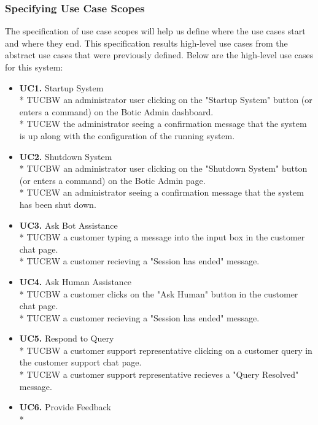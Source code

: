 \documentclass[11pt]{article}
\begin{document}
\subsubsection{Specifying Use Case Scopes}

The specification of use case scopes will help us define where the use cases start and where they end. This specification results high-level use cases from the abstract use cases that were previously defined. Below are the high-level use cases for this system:

\begin{itemize}
	\item[] \textbf{UC1.} Startup System\\*
	TUCBW an administrator user clicking on the "Startup System" button (or enters a command) on the Botic Admin dashboard.\\*
	TUCEW the administrator seeing a confirmation message that the system is up along with the configuration of the running system.
	\item[] \textbf{UC2.} Shutdown System\\*
	TUCBW an administrator user clicking on the "Shutdown System" button (or enters a command) on the Botic Admin page.\\*
	TUCEW an administrator seeing a confirmation message that the system has been shut down.
	\item[] \textbf{UC3.} Ask Bot Assistance\\*
	TUCBW a customer typing a message into the input box in the customer chat page.\\*
	TUCEW a customer recieving a "Session has ended" message.
	\item[] \textbf{UC4.} Ask Human Assistance\\*
	TUCBW a customer clicks on the "Ask Human" button in the customer chat page.\\*
	TUCEW a customer recieving a "Session has ended" message.
	\item[] \textbf{UC5.} Respond to Query\\*
	TUCBW a customer support representative clicking on a customer query in the customer support chat page.\\*
	TUCEW a customer support representative recieves a "Query Resolved" message.
	\item[] \textbf{UC6.} Provide Feedback\\* %

\end{itemize}
\end{document}
